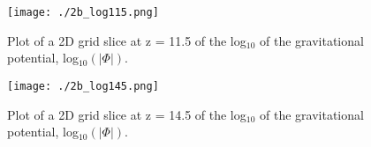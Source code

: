 \begin{figure}[h!]
  \centering
  \texttt{[image: ./2b\_log115.png]}
  \caption{Plot of a 2D grid slice at z = 11.5 of the log$_{10}$ of the gravitational potential, log$_{10}(|\Phi|)$.}
\end{figure}

\begin{figure}[h!]
  \centering
  \texttt{[image: ./2b\_log145.png]}
  \caption{Plot of a 2D grid slice at z = 14.5 of the log$_{10}$ of the gravitational potential, log$_{10}(|\Phi|)$.}
\end{figure}

\clearpage












